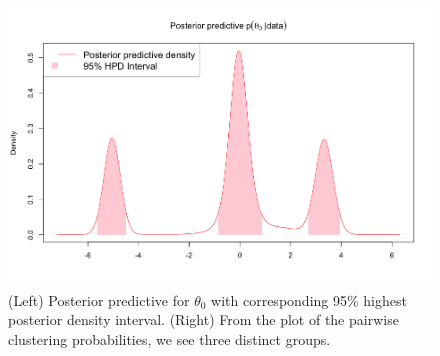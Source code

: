 \documentclass[a4paper, 10pt]{article}
\begin{document}
\begin{enumerate}
\begin{enumerate}
    \begin{figure}[h!]
        \centering
        \includegraphics[scale = 0.4]{pptheta.png}
        \caption{(Left) Posterior predictive for $\theta_0$ with corresponding 95\% highest posterior density interval. (Right) From the plot of the pairwise clustering probabilities, we see three distinct groups.}
        \label{pptheta}
    \end{figure}
    

\end{enumerate}
\end{enumerate}
\end{document}

